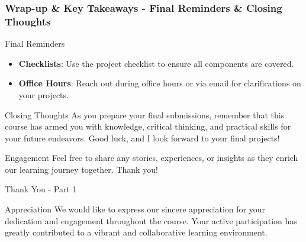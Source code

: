 \documentclass[aspectratio=169]{beamer}
\begin{document}
\begin{frame}[fragile]
    \frametitle{Wrap-up \& Key Takeaways - Final Reminders \& Closing Thoughts}
    \begin{block}{Final Reminders}
        \begin{itemize}
            \item \textbf{Checklists}: Use the project checklist to ensure all components are covered.
            \item \textbf{Office Hours}: Reach out during office hours or via email for clarifications on your projects.
        \end{itemize}
    \end{block}

    \begin{block}{Closing Thoughts}
        As you prepare your final submissions, remember that this course has armed you with knowledge, critical thinking, and practical skills for your future endeavors. Good luck, and I look forward to your final projects!
    \end{block}
    
    \begin{block}{Engagement}
        Feel free to share any stories, experiences, or insights as they enrich our learning journey together. Thank you!
    \end{block}
\end{frame}

\begin{frame}[fragile]{Thank You - Part 1}
  \begin{block}{Appreciation}
    We would like to express our sincere appreciation for your dedication and engagement throughout the course. Your active participation has greatly contributed to a vibrant and collaborative learning environment.
  \end{block}
\end{frame}
\end{document}
